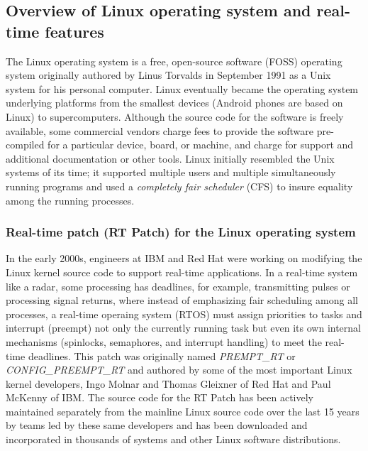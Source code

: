 \documentclass[12pt]{article}
\begin{document}
\subsection{Overview of Linux operating system and real-time features}
The Linux operating system is a free, open-source software (FOSS) operating
system originally authored by Linus Torvalds in September 1991 as a Unix system
for his personal computer.  Linux eventually became the operating system
underlying platforms from the smallest devices (Android phones are based on
Linux) to supercomputers. Although the source code for the software is freely
available, some commercial vendors charge fees to provide the software
pre-compiled for a particular device, board, or machine, and charge for support
and additional documentation or other tools.  Linux initially resembled the Unix
systems of its time; it supported multiple users and multiple simultaneously
running programs and used a \emph{completely fair scheduler} (CFS) to insure
equality among the running processes.

\subsubsection{Real-time patch (RT Patch) for the Linux operating system}
\label{section:rt_patch}
In the early 2000s, engineers at IBM and Red Hat were working on modifying the
Linux kernel source code to support real-time applications.  In a real-time
system like a radar, some processing has deadlines, for example, transmitting
pulses or processing signal returns, where instead of emphasizing fair
scheduling among all processes, a real-time operaing system (RTOS) must assign
priorities to tasks and interrupt (preempt) not only the currently running task
but even its own internal mechanisms (spinlocks, semaphores, and interrupt
handling) to meet the real-time deadlines.  This patch was originally named
\emph{PREMPT\_RT} or \emph{CONFIG\_PREEMPT\_RT} and authored by some of the most
important Linux kernel developers, Ingo Molnar and Thomas Gleixner of Red Hat
and Paul McKenny of IBM.  The source code for the RT Patch has been actively
maintained separately from the mainline Linux source code over the last 15 years
by teams led by these same developers and has been downloaded and incorporated
in thousands of systems and other Linux software distributions.
\end{document}
